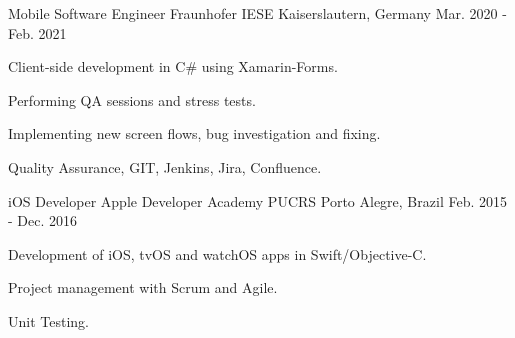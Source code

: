 \begin{cventries}
      \cventry
      {Mobile Software Engineer} %
      {Fraunhofer IESE} %
      {Kaiserslautern, Germany} %
      {Mar. 2020 - Feb. 2021} %
      {
      \begin{cvitems} %
        \item {Client-side development in C\# using Xamarin-Forms.}
        \item {Performing QA sessions and stress tests.}
        \item {Implementing new screen flows, bug investigation and fixing.}
        \item {Quality Assurance, GIT, Jenkins, Jira, Confluence.}
      \end{cvitems}
    }


  \cventry
    {iOS Developer} %
    {Apple Developer Academy PUCRS} %
    {Porto Alegre, Brazil} %
    {Feb. 2015 - Dec. 2016} %
    {
      \begin{cvitems} %
      \item {Development of iOS, tvOS and watchOS apps in Swift/Objective-C.}
      \item {Project management with Scrum and Agile.}
      \item {Unit Testing.}
      \end{cvitems}
    }

\end{cventries}
